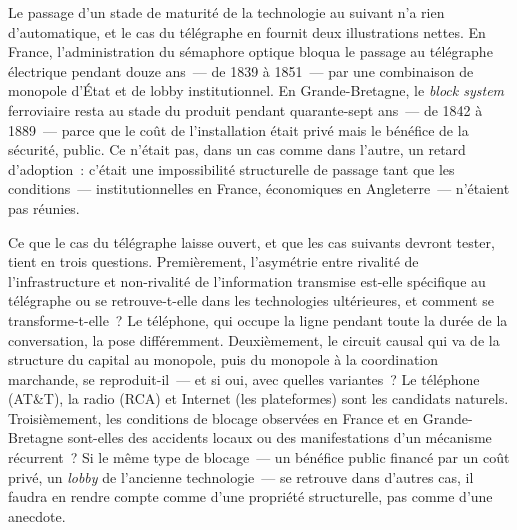 Le passage d'un stade de maturité de la technologie au suivant n'a rien d'automatique, et le cas du télégraphe en fournit deux illustrations nettes. En France, l'administration du sémaphore optique bloqua le passage au télégraphe électrique pendant douze ans~--- de 1839 à 1851~--- par une combinaison de monopole d'État et de lobby institutionnel. En Grande-Bretagne, le \emph{block system} ferroviaire resta au stade du produit pendant quarante-sept ans~--- de 1842 à 1889~--- parce que le coût de l'installation était privé mais le bénéfice de la sécurité, public. Ce n'était pas, dans un cas comme dans l'autre, un retard d'adoption~: c'était une impossibilité structurelle de passage tant que les conditions~--- institutionnelles en France, économiques en Angleterre~--- n'étaient pas réunies.

Ce que le cas du télégraphe laisse ouvert, et que les cas suivants devront tester, tient en trois questions. Premièrement, l'asymétrie entre rivalité de l'infrastructure et non-rivalité de l'information transmise est-elle spécifique au télégraphe ou se retrouve-t-elle dans les technologies ultérieures, et comment se transforme-t-elle~? Le téléphone, qui occupe la ligne pendant toute la durée de la conversation, la pose différemment. Deuxièmement, le circuit causal qui va de la structure du capital au monopole, puis du monopole à la coordination marchande, se reproduit-il~--- et si oui, avec quelles variantes~? Le téléphone (AT\&T), la radio (RCA) et Internet (les plateformes) sont les candidats naturels. Troisièmement, les conditions de blocage observées en France et en Grande-Bretagne sont-elles des accidents locaux ou des manifestations d'un mécanisme récurrent~? Si le même type de blocage~--- un bénéfice public financé par un coût privé, un \emph{lobby} de l'ancienne technologie~--- se retrouve dans d'autres cas, il faudra en rendre compte comme d'une propriété structurelle, pas comme d'une anecdote.
